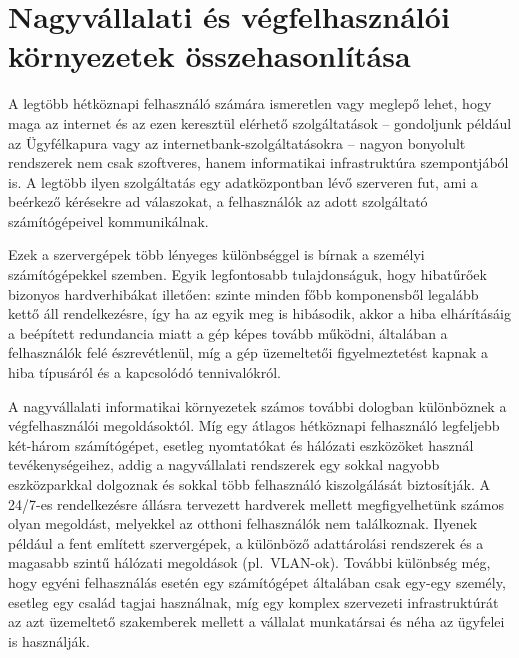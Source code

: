 
\section{Nagyvállalati és végfelhasználói környezetek összehasonlítása}
A legtöbb hétköznapi felhasználó számára ismeretlen vagy meglepő lehet, hogy maga az internet és az ezen keresztül elérhető szolgáltatások -- gondoljunk például az Ügyfélkapura vagy az internetbank-szolgáltatásokra -- nagyon bonyolult rendszerek nem csak szoftveres, hanem informatikai infrastruktúra szempontjából is. A legtöbb ilyen szolgáltatás egy adatközpontban lévő szerveren fut, ami a beérkező kérésekre ad válaszokat, a felhasználók az adott szolgáltató számítógépeivel kommunikálnak.

Ezek a szervergépek több lényeges különbséggel is bírnak a személyi számítógépekkel szemben. Egyik legfontosabb tulajdonságuk, hogy hibatűrőek bizonyos hardverhibákat illetően: szinte minden főbb komponensből legalább kettő áll rendelkezésre, így ha az egyik meg is hibásodik, akkor a hiba elhárításáig a beépített redundancia miatt a gép képes tovább működni, általában a felhasználók felé észrevétlenül, míg a gép üzemeltetői figyelmeztetést kapnak a hiba típusáról és a kapcsolódó tennivalókról.

A nagyvállalati informatikai környezetek számos további dologban különböznek a végfelhasználói megoldásoktól. Míg egy átlagos hétköznapi felhasználó legfeljebb két-három számítógépet, esetleg nyomtatókat és hálózati eszközöket használ tevékenységeihez, addig a nagyvállalati rendszerek egy sokkal nagyobb eszközparkkal dolgoznak és sokkal több felhasználó kiszolgálását biztosítják. A 24/7-es rendelkezésre állásra tervezett hardverek mellett megfigyelhetünk számos olyan megoldást, melyekkel az otthoni felhasználók nem találkoznak. Ilyenek például a fent említett szervergépek, a különböző adattárolási rendszerek és a magasabb szintű hálózati megoldások (pl.~VLAN-ok). További különbség még, hogy egyéni felhasználás esetén egy számítógépet általában csak egy-egy személy, esetleg egy család tagjai használnak, míg egy komplex szervezeti infrastruktúrát az azt üzemeltető szakemberek mellett a vállalat munkatársai és néha az ügyfelei is használják.

